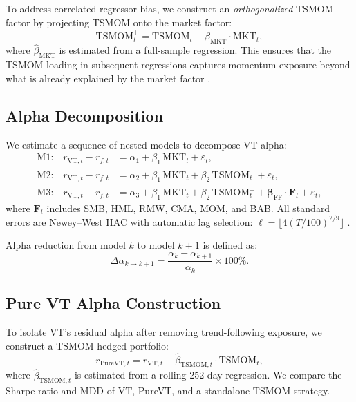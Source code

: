 To address correlated-regressor bias, we construct an \textit{orthogonalized} TSMOM factor by projecting TSMOM onto the market factor:
\begin{equation}
\text{TSMOM}_t^{\perp} = \text{TSMOM}_t - \hat{\beta}_{\text{MKT}} \cdot \text{MKT}_t,
\label{eq:tsmom_orth}
\end{equation}
where $\hat{\beta}_{\text{MKT}}$ is estimated from a full-sample regression. This ensures that the TSMOM loading in subsequent regressions captures momentum exposure beyond what is already explained by the market factor \citep{hood2025}.

\subsection{Alpha Decomposition}

We estimate a sequence of nested models to decompose VT alpha:
\begin{align}
\text{M1:} \quad r_{\text{VT},t} - r_{f,t} &= \alpha_1 + \beta_1 \, \text{MKT}_t + \varepsilon_t, \label{eq:m1} \\
\text{M2:} \quad r_{\text{VT},t} - r_{f,t} &= \alpha_2 + \beta_1 \, \text{MKT}_t + \beta_2 \, \text{TSMOM}_t^{\perp} + \varepsilon_t, \label{eq:m2} \\
\text{M3:} \quad r_{\text{VT},t} - r_{f,t} &= \alpha_3 + \beta_1 \, \text{MKT}_t + \beta_2 \, \text{TSMOM}_t^{\perp} + \boldsymbol{\beta}_{\text{FF}} \cdot \mathbf{F}_t + \varepsilon_t, \label{eq:m3}
\end{align}
where $\mathbf{F}_t$ includes SMB, HML, RMW, CMA, MOM, and BAB. All standard errors are Newey--West HAC with automatic lag selection: $\ell = \lfloor 4(T/100)^{2/9} \rfloor$ \citep{newey1987}.

Alpha reduction from model $k$ to model $k+1$ is defined as:
\begin{equation}
\Delta\alpha_{k \to k+1} = \frac{\alpha_k - \alpha_{k+1}}{\alpha_k} \times 100\%.
\label{eq:alpha_reduction}
\end{equation}

\subsection{Pure VT Alpha Construction}

To isolate VT's residual alpha after removing trend-following exposure, we construct a TSMOM-hedged portfolio:
\begin{equation}
r_{\text{PureVT},t} = r_{\text{VT},t} - \hat{\beta}_{\text{TSMOM},t} \cdot \text{TSMOM}_t,
\label{eq:pure_vt}
\end{equation}
where $\hat{\beta}_{\text{TSMOM},t}$ is estimated from a rolling 252-day regression. We compare the Sharpe ratio and MDD of VT, PureVT, and a standalone TSMOM strategy.

